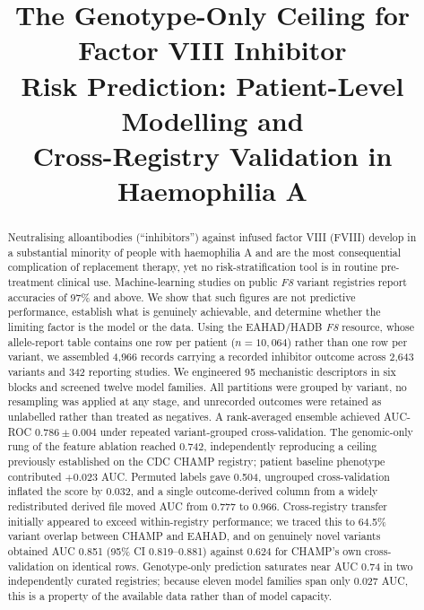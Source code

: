 \documentclass[conference]{IEEEtran}
\begin{document}
\title{The Genotype-Only Ceiling for Factor VIII Inhibitor\\Risk Prediction: Patient-Level Modelling and\\Cross-Registry Validation in Haemophilia A}

\author{
}

\maketitle

\begin{abstract}
Neutralising alloantibodies (``inhibitors'') against infused factor VIII
(FVIII) develop in a substantial minority of people with haemophilia A and are
the most consequential complication of replacement therapy, yet no
risk-stratification tool is in routine pre-treatment clinical use.
Machine-learning studies on public \textit{F8} variant registries report
accuracies of 97\% and above. We show that such figures are not predictive
performance, establish what is genuinely achievable, and determine whether the
limiting factor is the model or the data. Using the EAHAD/HADB \textit{F8}
resource, whose allele-report table contains one row per patient
($n = 10{,}064$) rather than one row per variant, we assembled 4{,}966 records
carrying a recorded inhibitor outcome across 2{,}643 variants and 342
reporting studies. We engineered 95 mechanistic descriptors in six blocks and
screened twelve model families. All partitions were grouped by variant, no
resampling was applied at any stage, and unrecorded outcomes were retained as
unlabelled rather than treated as negatives. A rank-averaged ensemble achieved
AUC-ROC $0.786 \pm 0.004$ under repeated variant-grouped cross-validation. The
genomic-only rung of the feature ablation reached 0.742, independently
reproducing a ceiling previously established on the CDC CHAMP registry;
patient baseline phenotype contributed $+0.023$ AUC. Permuted labels gave
0.504, ungrouped cross-validation inflated the score by 0.032, and a single
outcome-derived column from a widely redistributed derived file moved AUC from
0.777 to 0.966. Cross-registry transfer initially appeared to exceed
within-registry performance; we traced this to 64.5\% variant overlap between
CHAMP and EAHAD, and on genuinely novel variants obtained AUC 0.851 (95\% CI
0.819--0.881) against 0.624 for CHAMP's own cross-validation on identical
rows. Genotype-only prediction saturates near AUC 0.74 in two independently
curated registries; because eleven model families span only 0.027 AUC, this is
a property of the available data rather than of model capacity.
\end{abstract}
\end{document}
